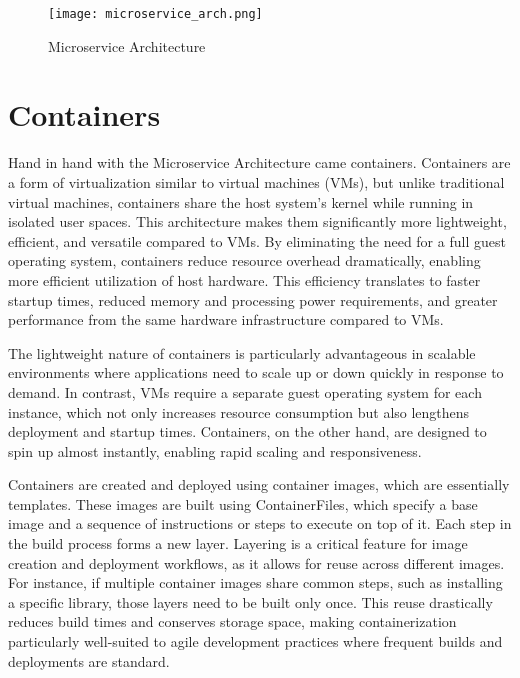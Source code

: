 \begin{figure}[!h]
    \graphicspath{ {./diagrams/} }
    \texttt{[image: microservice\_arch.png]}
    \centering
    \caption{Microservice Architecture}
    \label{fig:micro_arch}
\end{figure}

\section{Containers}

Hand in hand with the Microservice Architecture came containers. Containers are a form of virtualization similar to virtual machines (VMs), but unlike traditional virtual machines, containers share the host system's kernel while running in isolated user spaces. This architecture makes them significantly more lightweight, efficient, and versatile compared to VMs. By eliminating the need for a full guest operating system, containers reduce resource overhead dramatically, enabling more efficient utilization of host hardware. This efficiency translates to faster startup times, reduced memory and processing power requirements, and greater performance from the same hardware infrastructure compared to VMs\cite{Pahl2015}.

The lightweight nature of containers is particularly advantageous in scalable environments where applications need to scale up or down quickly in response to demand. In contrast, VMs require a separate guest operating system for each instance, which not only increases resource consumption but also lengthens deployment and startup times. Containers, on the other hand, are designed to spin up almost instantly, enabling rapid scaling and responsiveness.

Containers are created and deployed using container images, which are essentially templates. These images are built using ContainerFiles, which specify a base image and a sequence of instructions or steps to execute on top of it. Each step in the build process forms a new layer. Layering is a critical feature for image creation and deployment workflows, as it allows for reuse across different images. For instance, if multiple container images share common steps, such as installing a specific library, those layers need to be built only once. This reuse drastically reduces build times and conserves storage space, making containerization particularly well-suited to agile development practices where frequent builds and deployments are standard.

